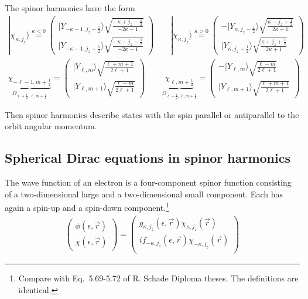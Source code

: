 \documentclass[11pt,a4paper]{report}
\begin{document}
The spinor harmonics have the form
\begin{eqnarray}
|\chi_{\kappa,j_z}\rangle
\stackrel{\kappa<0}{=}\left(
\begin{array}{c}
|Y_{-\kappa-1,j_z-\frac{1}{2}}\rangle
\sqrt{\frac{-\kappa+j_z-\frac{1}{2}}{-2\kappa-1}}\\
|Y_{-\kappa-1,j_z+\frac{1}{2}}\rangle
\sqrt{\frac{-\kappa-j_z-\frac{1}{2}}{-2\kappa-1}}\end{array}\right)
\qquad
|\chi_{\kappa,j_z}\rangle
\stackrel{\kappa>0}{=}\left(
\begin{array}{c}
-|Y_{\kappa,j_z-\frac{1}{2}}\rangle
\sqrt{\frac{\kappa-j_z+\frac{1}{2}}{2\kappa+1}}\\
|Y_{\kappa,j_z+\frac{1}{2}}\rangle
\sqrt{\frac{\kappa+j_z+\frac{1}{2}}{2\kappa+1}}\end{array}\right)
\label{eq:spinorharmonicskappa_a}
\\
\underbrace{\chi_{-\ell-1,m+\frac{1}{2}}}_{\Omega_{\ell+\frac{1}{2},\ell,m+\frac{1}{2}}}
=\left(
\begin{array}{c}
|Y_{\ell,m}\rangle\sqrt{\frac{\ell+m+1}{2\ell+1}}\\
|Y_{\ell,m+1}\rangle\sqrt{\frac{\ell-m}{2\ell+1}}\end{array}\right)
\qquad
\underbrace{\chi_{\ell,m+\frac{1}{2}}}_{\Omega_{\ell-\frac{1}{2},\ell,m+\frac{1}{2}}}
=\left(
\begin{array}{c}
-|Y_{\ell,m}\rangle\sqrt{\frac{\ell-m}{2\ell+1}}\\
|Y_{\ell,m+1}\rangle\sqrt{\frac{\ell+m+1}{2\ell+1}}\end{array}\right)
\label{eq:spinorharmonicskappa}
\end{eqnarray}

Then spinor harmonics describe states with the spin parallel or
antiparallel to the orbit angular momentum.

\subsection{Spherical Dirac equations in spinor harmonics}
The wave function of an electron is a four-component spinor function
consisting of a two-dimensional large and a two-dimensional small
component. Each has again a spin-up and a spin-down
component.\footnote{Compare with Eq.~5.69-5.72 of R. Schade Diploma
  theses. The definitions are identical.}
\begin{eqnarray}
\left(\begin{array}{c}\phi(\epsilon,\vec{r})\\\chi(\epsilon,\vec{r})
\end{array}\right) =
\left(\begin{array}{c}g_{\kappa,j_z}(\epsilon,\vec{r})
\chi_{\kappa,j_z}(\vec{r})\\ if_{-\kappa,j_z}(\epsilon,\vec{r})
\chi_{-\kappa,j_z}(\vec{r})\\ \end{array}\right) 
\end{eqnarray} 
\end{document}
